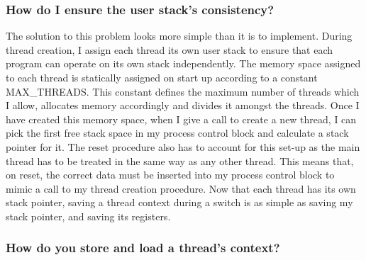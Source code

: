 \subsubsection{How do I ensure the user stack's consistency?}
The solution to this problem looks more simple than it is to implement. During thread creation, I assign each thread its own user stack to ensure that each program can operate on its own stack independently. The memory space assigned to each thread is statically assigned on start up according to a constant MAX\_THREADS. This constant defines the maximum number of threads which I allow, allocates memory accordingly and divides it amongst the threads.  Once I have created this memory space, when I give a call to create a new thread, I can pick the first free stack space in my process control block and calculate a stack pointer for it. The reset procedure also has to account for this set-up as the main thread has to be treated in the same way as any other thread.  This means that, on reset, the correct data must be inserted into my process control block to mimic a call to my thread creation procedure. Now that each thread has its own stack pointer, saving a thread context during a switch is as simple as saving my stack pointer, and saving its registers.
\newpage
\subsubsection{How do you store and load a thread's context?}


